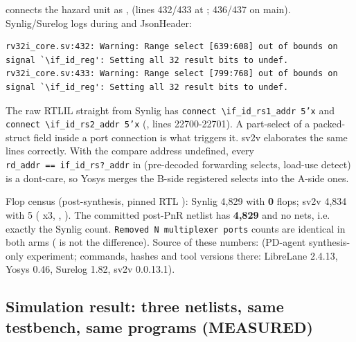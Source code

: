 \begin{record}

 connects the hazard unit as
,
 (lines 432/433 at
; 436/437 on main). Synlig/\allowbreak{}Surelog logs
during  and JsonHeader:

\begin{lstlisting}[language={}]
rv32i_core.sv:432: Warning: Range select [639:608] out of bounds on signal `\if_id_reg': Setting all 32 result bits to undef.
rv32i_core.sv:433: Warning: Range select [799:768] out of bounds on signal `\if_id_reg': Setting all 32 result bits to undef.
\end{lstlisting}

The raw RTLIL straight from Synlig has
\texttt{connect\ \textbackslash{}if\_\allowbreak{}id\_\allowbreak{}rs1\_\allowbreak{}addr\ 5'x}
and
\texttt{connect\ \textbackslash{}if\_\allowbreak{}id\_\allowbreak{}rs2\_\allowbreak{}addr\ 5'x}
(, lines 22700-22701). A part-select of a
packed-struct field inside a port connection is what triggers it. sv2v
elaborates the same lines correctly. With the compare address undefined,
every
\texttt{rd\_\allowbreak{}addr\ =\allowbreak{}=\allowbreak{}\ if\_\allowbreak{}id\_\allowbreak{}rs?\_\allowbreak{}addr}
in  (pre-decoded forwarding selects, load-use
detect) is a don\textquotesingle t-care, so Yosys merges the B-side
registered selects into the A-side ones.

Flop census (post-synthesis, pinned RTL ): Synlig 4,829
 with \textbf{0}  flops; sv2v 4,834 with 5
( x3, , ). The
committed post-PnR netlist has \textbf{4,829}  and no
 nets, i.e. exactly the Synlig count.
\texttt{Removed\ N\ multiplexer\ ports} counts are identical in both
arms ( is not the difference). Source of these
numbers:  (PD-agent
synthesis-only experiment; commands, hashes and tool versions there:
LibreLane 2.4.13, Yosys 0.46, Surelog 1.82, sv2v 0.0.13.1).

\end{record}

\subsection{Simulation result: three netlists, same testbench, same
programs (MEASURED)}\label{cr:defect:sky130-cpu-synlig-dud4:simulation-result-three-netlists-same-testbench-same-programs-measured}

